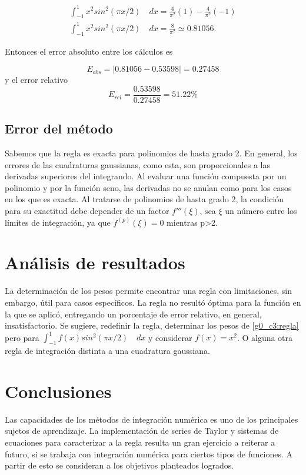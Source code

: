 \documentclass[../portafolio.tex]{subfiles}
\begin{document}
\begin{align*}
\int_{-1}^{1} x^2sin^2(\pi x/2) \quad dx =\frac{4}{\pi^2}(1)  -  \frac{4}{\pi^2}(-1) \\
\int_{-1}^{1} x^2sin^2(\pi x/2) \quad dx =\frac{8}{\pi^2}\simeq 0.81056.
\end{align*}

Entonces el error absoluto entre los cálculos es 

\begin{equation}
E_{abs}=|0.81056-0.53598|=0.27458
\end{equation}
y el error relativo 
\begin{equation}
E_{rel}=\frac{0.53598}{0.27458}=51.22\%
\end{equation}
\subsection{Error del método}
Sabemos que la regla es exacta para polinomios de hasta grado 2. En general, los errores de las cuadraturas gaussianas, como esta, son proporcionales a las derivadas superiores del integrando. Al evaluar una función compuesta por un polinomio y por la función seno, las derivadas no se anulan como para los casos en los que es exacta. Al tratarse de polinomios de hasta grado 2, la condición para su exactitud debe depender de un factor $f'''(\xi)$, sea $\xi$ un número entre los límites de integración, ya que $f^{(p)} (\xi)=0$ mientras p>2.


\section{Análisis de resultados}
La determinación de los pesos permite encontrar una regla con limitaciones, sin embargo, útil para casos específicos. La regla no resultó óptima para la función en la que se aplicó, entregando un porcentaje de error relativo, en general, insatisfactorio. Se sugiere, redefinir la regla, determinar los pesos de \eqref{g0_c3:regla} pero para $\int_{-1}^{1} f(x) sin^2(\pi x/2) \quad dx$ y considerar $f(x)=x^2$. O alguna otra regla de integración distinta a una cuadratura gaussiana.
\section*{Conclusiones}
Las capacidades de los métodos de integración numérica es uno de los principales sujetos de aprendizaje. La implementación de series de Taylor y sistemas de ecuaciones para caracterizar a la regla resulta un gran ejercicio a reiterar a futuro, si se trabaja con integración numérica para ciertos tipos de funciones. A partir de esto se consideran a los objetivos planteados logrados.
\end{document}
